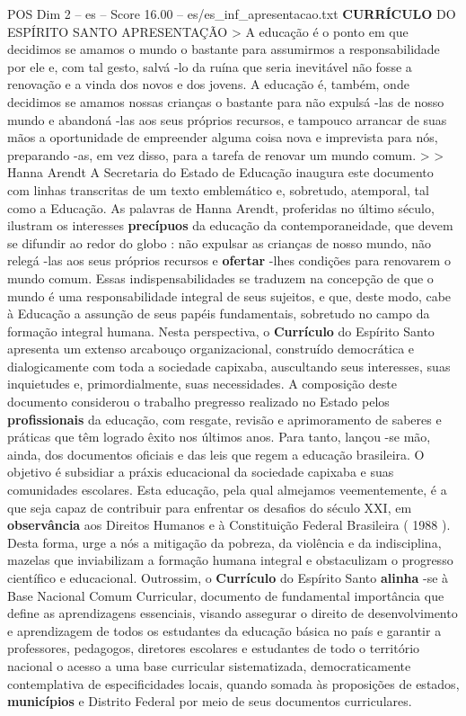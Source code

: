 \begin{textsample}{POS Dim 2 – es – Score 16.00 – es/es\_inf\_apresentacao.txt}  \label{ex:f2_pos_219}
\textbf{CURRÍCULO} DO ESPÍRITO SANTO APRESENTAÇÃO > A educação é o ponto em que decidimos se amamos o mundo o bastante para assumirmos a responsabilidade por ele e, com tal gesto, salvá -lo da ruína que seria inevitável não fosse a renovação e a vinda dos novos e dos jovens.
A educação é, também, onde decidimos se amamos nossas crianças o bastante para não expulsá -las de nosso mundo e abandoná -las aos seus próprios recursos, e tampouco arrancar de suas mãos a oportunidade de empreender alguma coisa nova e imprevista para nós, preparando -as, em vez disso, para a tarefa de renovar um mundo comum. > > Hanna Arendt A Secretaria do Estado de Educação inaugura este documento com linhas transcritas de um texto emblemático e, sobretudo, atemporal, tal como a Educação.
As palavras de Hanna Arendt, proferidas no último século, ilustram os interesses \textbf{precípuos} da educação da contemporaneidade, que devem se difundir ao redor do globo : não expulsar as crianças de nosso mundo, não relegá -las aos seus próprios recursos e \textbf{ofertar} -lhes condições para renovarem o mundo comum.
Essas indispensabilidades se traduzem na concepção de que o mundo é uma responsabilidade integral de seus sujeitos, e que, deste modo, cabe à Educação a assunção de seus papéis fundamentais, sobretudo no campo da formação integral humana.
Nesta perspectiva, o \textbf{Currículo} do Espírito Santo apresenta um extenso arcabouço organizacional, construído democrática e dialogicamente com toda a sociedade capixaba, auscultando seus interesses, suas inquietudes e, primordialmente, suas necessidades.
A composição deste documento considerou o trabalho pregresso realizado no Estado pelos \textbf{profissionais} da educação, com resgate, revisão e aprimoramento de saberes e práticas que têm logrado êxito nos últimos anos.
Para tanto, lançou -se mão, ainda, dos documentos oficiais e das leis que regem a educação brasileira.
O objetivo é subsidiar a práxis educacional da sociedade capixaba e suas comunidades escolares.
Esta educação, pela qual almejamos veementemente, é a que seja capaz de contribuir para enfrentar os desafios do século XXI, em \textbf{observância} aos Direitos Humanos e à Constituição Federal Brasileira ( 1988 ).
Desta forma, urge a nós a mitigação da pobreza, da violência e da indisciplina, mazelas que inviabilizam a formação humana integral e obstaculizam o progresso científico e educacional.
Outrossim, o \textbf{Currículo} do Espírito Santo \textbf{alinha} -se à Base Nacional Comum Curricular, documento de fundamental importância que define as aprendizagens essenciais, visando assegurar o direito de desenvolvimento e aprendizagem de todos os estudantes da educação básica no país e garantir a professores, pedagogos, diretores escolares e estudantes de todo o território nacional o acesso a uma base curricular sistematizada, democraticamente contemplativa de especificidades locais, quando somada às proposições de estados, \textbf{municípios} e Distrito Federal por meio de seus documentos curriculares.

\end{textsample}
